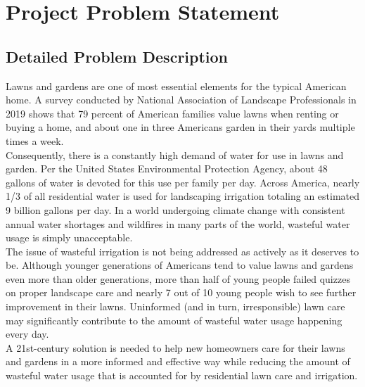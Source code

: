 \chapter{Project Problem Statement}
\section{Detailed Problem Description}
	Lawns and gardens are one of most essential elements for the typical American home. A survey conducted by National Association of Landscape Professionals in 2019 shows that 79 percent of American families value lawns when renting or buying a home, and about one in three Americans garden in their yards multiple times a week\cite{noauthor_new_2019}. \\
	
	Consequently, there is a constantly high demand of water for use in lawns and garden. Per the United States Environmental Protection Agency, about 48 gallons of water is devoted for this use per family per day. Across America, nearly 1/3 of all residential water is used for landscaping irrigation totaling an estimated 9 billion gallons per day\cite{epa_outdoor_nodate}. In a world undergoing climate change with consistent annual water shortages and wildfires in many parts of the world, wasteful water usage is simply unacceptable. \\
	
	The issue of wasteful irrigation is not being addressed as actively as it deserves to be. Although younger generations of Americans tend to value lawns and gardens even more than older generations, more than half of young people failed quizzes on proper landscape care and nearly 7 out of 10 young people wish to see further improvement in their lawns\cite{noauthor_new_2016}. Uninformed (and in turn, irresponsible) lawn care may significantly contribute to the amount of wasteful water usage happening every day.  \\
	
	A 21st-century solution is needed to help new homeowners care for their lawns and gardens in a more informed and effective way while reducing the amount of wasteful water usage that is accounted for by residential lawn care and irrigation. 
